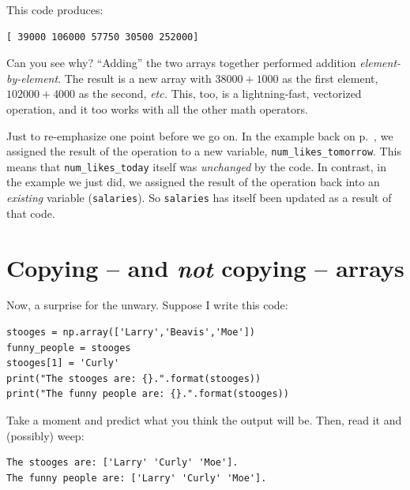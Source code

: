 This code produces:

\begin{Verbatim}[fontsize=\small,samepage=true,frame=leftline,framesep=5mm,framerule=1mm]
[ 39000 106000 57750 30500 252000]
\end{Verbatim}

Can you see why? ``Adding'' the two arrays together performed addition
\textit{element-by-element}. The result is a new array with $38000+1000$ as the
first element, $102000+4000$ as the second, \textit{etc.} This, too, is a
lightning-fast, vectorized operation, and it too works with all the other math
operators.

Just to re-emphasize one point before we go on. In the example back on
p.~\pageref{vectorizedArrayIntExample}, we assigned the result of the operation
to a new variable, \texttt{num\_likes\_tomorrow}. This means that
\texttt{num\_likes\_today} itself was \textit{unchanged} by the code. In
contrast, in the example we just did, we assigned the result of the operation
back into an \textit{existing} variable (\texttt{salaries}). So
\texttt{salaries} has itself been updated as a result of that code.



\section{Copying -- and \textit{not} copying -- arrays}

\label{copyingNotCopyingArrays}
Now, a surprise for the unwary. Suppose I write this code:

\label{code:refNotCopy}
\begin{Verbatim}[fontsize=\small,samepage=true,frame=single,framesep=3mm]
stooges = np.array(['Larry','Beavis','Moe'])
funny_people = stooges
stooges[1] = 'Curly'
print("The stooges are: {}.".format(stooges))
print("The funny people are: {}.".format(stooges))
\end{Verbatim}

Take a moment and predict what you think the output will be. Then, read it and
(possibly) weep:

\begin{Verbatim}[fontsize=\small,samepage=true,frame=leftline,framesep=5mm,framerule=1mm]
The stooges are: ['Larry' 'Curly' 'Moe'].
The funny people are: ['Larry' 'Curly' 'Moe'].
\end{Verbatim}

